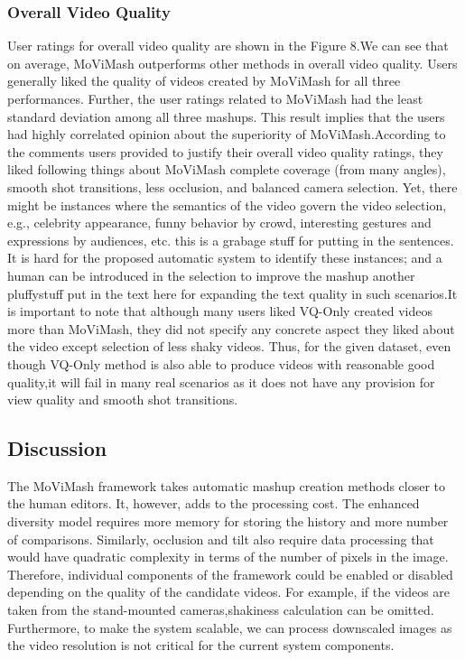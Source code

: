 \documentclass{IEEEtran}
\begin{document}
\subsubsection{Overall Video Quality}
User ratings for overall video quality are shown in the Figure 8.We can see that on average, MoViMash outperforms other methods in overall video quality. Users generally liked the quality of videos created by MoViMash for all three performances. Further, the user ratings related to MoViMash had the least standard deviation among all three mashups. This result implies that the users had highly correlated opinion about the superiority of MoViMash.According to the comments users provided to justify their overall video quality ratings, they liked following things about MoViMash complete coverage (from many angles), smooth shot transitions, less occlusion, and balanced camera selection. Yet, there might be instances where the semantics of the video govern the video selection, e.g., celebrity appearance, funny behavior by crowd, interesting gestures and expressions by audiences, etc. this is a grabage stuff for putting in the sentences. It is hard for the proposed automatic system to identify these instances; and a human can be introduced in the selection to improve the mashup another pluffystuff put in the text here for expanding the text quality in such scenarios.It is important to note that although many users liked VQ-Only created videos more than MoViMash, they did not specify any concrete aspect they liked about the video except selection of less shaky videos. Thus, for the given dataset, even though VQ-Only
method is also able to produce videos with reasonable good quality,it will fail in many real scenarios as it does not have any provision for view quality and smooth shot transitions.
\subsection{Discussion}
The MoViMash framework takes automatic mashup creation methods closer to the human editors. It, however, adds to the processing cost. The enhanced diversity model requires more memory for storing the history and more number of comparisons. Similarly, occlusion and tilt also require data processing that would have quadratic complexity in terms of the number of pixels in the image. Therefore, individual components of the framework could be enabled or disabled depending on the quality of the candidate videos. For example, if the videos are taken from the stand-mounted cameras,shakiness calculation can be omitted. Furthermore, to make the system scalable, we can process downscaled images as the video resolution is not critical for the current system components.
\end{document}
